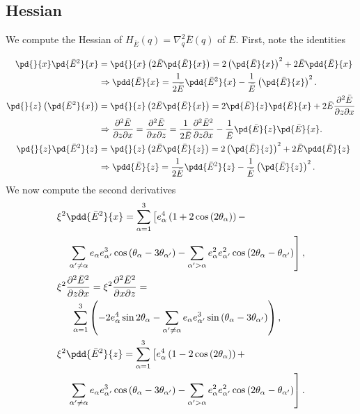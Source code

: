 \subsection{Hessian}
\label{ssec:hessian}

\noindent We compute the Hessian of $H_{\bar{E}}(q) = \nabla_q^2 \bar{E}(q)$ of
$\bar{E}$. First, note the identities

\begin{align*}
    \pd{}{x}\pd{\bar{E}^2}{x} &= \pd{}{x}\left( 2\bar{E}\pd{\bar{E}}{x} \right) =
    2\left(\pd{\bar{E}}{x}\right)^2 + 2\bar{E}\pdd{\bar{E}}{x} \\
&\Rightarrow \pdd{\bar{E}}{x} = \frac{1}{2\bar{E}} \pdd{\bar{E}^2}{x} -
\frac{1}{\bar{E}}\left(\pd{\bar{E}}{x}\right)^2. \\
    \pd{}{z}\left(\pd{\bar{E}^2}{x}\right) &=
    \pd{}{z}\left(2\bar{E}\pd{\bar{E}}{x}\right) =
    2\pd{\bar{E}}{z}\pd{\bar{E}}{x} + 2\bar{E}\frac{\partial^2 \bar{E}}{\partial
    z \partial x} \\
&\Rightarrow \frac{\partial^2 \bar{E}}{\partial z \partial x} = \frac{\partial^2
\bar{E}}{\partial x \partial z} = \frac{1}{2\bar{E}} \frac{\partial^2
\bar{E}^2}{\partial z \partial x} - \frac{1}{\bar{E}}
\pd{\bar{E}}{z}\pd{\bar{E}}{x}. \\
\pd{}{z}\pd{\bar{E}^2}{z} &= \pd{}{z}\left( 2\bar{E}\pd{\bar{E}}{z} \right) =
    2\left(\pd{\bar{E}}{z}\right)^2 + 2\bar{E}\pdd{\bar{E}}{z} \\
&\Rightarrow \pdd{\bar{E}}{z} = \frac{1}{2\bar{E}} \pdd{\bar{E}^2}{z} -
\frac{1}{\bar{E}}\left(\pd{\bar{E}}{z}\right)^2.
\end{align*}
%
We now compute the second derivatives
%
\begin{align*}
    &\xi^2 \pdd{\bar{E}^2}{x} = \sum_{\alpha=1}^3 \left[e_\alpha^4 \left(1 +
    2\cos{(2\theta_\alpha)}\right) - \right. \\ 
    &\phantom{13}\left. \sum_{\alpha^\prime \neq \alpha} e_\alpha
e_{\alpha^\prime}^3 \cos{(\theta_\alpha - 3\theta_{\alpha^\prime})} -
\sum_{\alpha^\prime > \alpha} e_\alpha^2 e_{\alpha^\prime}^2 \cos{(2\theta_\alpha
- \theta_{\alpha^\prime})}\right], \\
   &\xi^2 \frac{\partial^2 \bar{E}^2}{\partial z \partial x} = \xi^2
   \frac{\partial^2 \bar{E}^2}{\partial x \partial z} = \\
   &\phantom{123}\sum_{\alpha=1}^3
   \left( -2e_\alpha^4\sin{2\theta_\alpha} - \sum_{\alpha^\prime \neq \alpha}
   e_\alpha e_{\alpha^\prime}^3 \sin{(\theta_\alpha -
3\theta_{\alpha^\prime})}\right), \\
&\xi^2 \pdd{\bar{E}^2}{z} = \sum_{\alpha=1}^3 \left[e_\alpha^4 \left(1 -
    2\cos{(2\theta_\alpha)}\right) + \right. \\ 
    &\phantom{13}\left. \sum_{\alpha^\prime \neq \alpha} e_\alpha
e_{\alpha^\prime}^3 \cos{(\theta_\alpha - 3\theta_{\alpha^\prime})} -
\sum_{\alpha^\prime > \alpha} e_\alpha^2 e_{\alpha^\prime}^2 \cos{(2\theta_\alpha
- \theta_{\alpha^\prime})}\right].
\end{align*}

